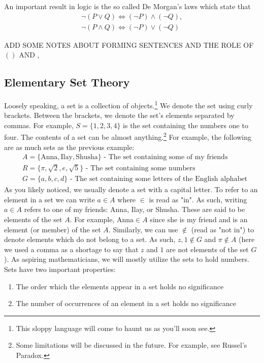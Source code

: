 \documentclass{tufte-handout} %
\theoremstyle{definition}
\theoremstyle{remark}
\begin{document}
An important result in logic is the so called De Morgan's laws which state that 
\begin{align*}
    {\displaystyle \neg (P\lor Q)\iff (\neg P)\land (\neg Q),} \\
    {\displaystyle \neg (P\land Q)\iff (\neg P)\lor (\neg Q)}
\end{align*}

ADD SOME NOTES ABOUT FORMING SENTENCES AND THE ROLE OF $()$ AND , 
\\
\subsection{Elementary Set Theory}
Loosely speaking, a set is a collection of objects.\footnote{This sloppy language will come to haunt us as you'll soon see.} We denote the set using curly brackets. Between the brackets, we denote the set's elements separated by commas. For example, $S= \{1,2,3,4\}$ is the set containing the numbers one to four. The contents of a set can be almost anything.\footnote{Some limitations will be discussed in the future. For example, see Russel's Paradox.} For example, the following are as much sets as the previous example:
\begin{align*}
    &A = \{\text{Anna}, \text{Ilay}, \text{Shusha}\} \text{ - The set containing some of my friends} \\
    &R = \{\pi, \sqrt{2}, e, \sqrt{5}\} \text{ - The set containing some numbers}\\
    &G = \{a,b,c,d\} \text{ - The set containing some letters of the English alphabet}
\end{align*}
As you likely noticed, we usually denote a set with a capital letter. To refer to an element in a set we can write $a\in A$ where $\in$ is read as "in". As such, writing $a\in A$ refers to one of my friends: Anna, Ilay, or Shusha. These are said to be elements of the set $A$. For example, $\text{Anna} \in A$ since she is my friend and is an element (or member) of the set $A$. Similarly, we can use $\not\in$ (read as "not in") to denote elements which do not belong to a set. As such, $z,1 \not\in G$ and $\pi \not\in A$ (here we used a comma as a shortage to say that $z$ and $1$ are not elements of the set $G$). As aspiring mathematicians, we will mostly utilize the sets to hold numbers.
\\
Sets have two important properties:
\begin{enumerate}
    \item The order which the elements appear in a set holds no significance
    \item The number of occurrences of an element in a set holds no significance
\end{enumerate}
\end{document}
